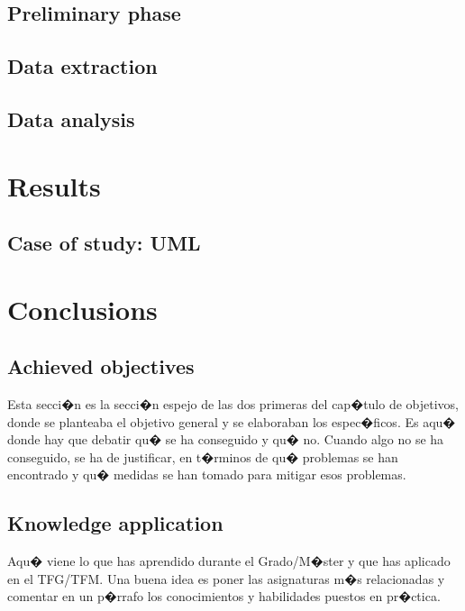 \documentclass[a4paper, 12pt]{book}
\begin{document}
\section{Preliminary phase}
\label{sec:fase-preliminar}
\section{Data extraction}
\label{sec:extraccion-datos}
\section{Data analysis}
\label{sec:analisis-datos}
\cleardoublepage
\chapter{Results}
\section{Case of study: UML}
\label{sec:caso-estudio-uml}
\cleardoublepage
\chapter{Conclusions}
\label{chap:conclusiones}
\section{Achieved objectives}
\label{sec:consecucion-objetivos}
Esta secci�n es la secci�n espejo de las dos primeras del cap�tulo de objetivos,
donde se planteaba el objetivo general y se elaboraban los espec�ficos.
Es aqu� donde hay que debatir qu� se ha conseguido y qu� no. Cuando algo no
se ha conseguido, se ha de justificar, en t�rminos de qu� problemas se han
encontrado y qu� medidas se han tomado para mitigar esos problemas.
\section{Knowledge application}
\label{sec:aplicacion}
Aqu� viene lo que has aprendido durante el Grado/M�ster y que has aplicado
en el TFG/TFM. Una buena idea es poner las asignaturas m�s relacionadas y
comentar en un p�rrafo los conocimientos y habilidades puestos en pr�ctica.
\end{document}
